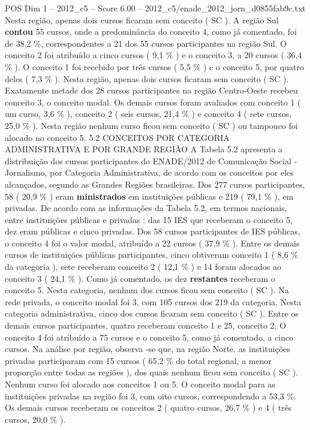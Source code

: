 \begin{textsample}{POS Dim 1 – 2012\_c5 – Score 6.00 – 2012\_c5/enade\_2012\_jorn\_d0855fab9c.txt}
Nesta região, apenas dois cursos ficaram sem conceito ( SC ).
A região Sul \textbf{contou} 55 cursos, onde a predominância do conceito 4, como já comentado, foi de 38,2 \%, correspondentes a 21 dos 55 cursos participantes na região Sul.
O conceito 2 foi atribuído a cinco cursos ( 9,1 \% ) e o conceito 3, a 20 cursos ( 36,4 \% ).
O conceito 1 foi recebido por três cursos ( 5,5 \% ) e o conceito 5, por quatro deles ( 7,3 \% ).
Nesta região, apenas dois cursos ficaram sem conceito ( SC ).
Exatamente metade dos 28 cursos participantes na região Centro-Oeste recebeu conceito 3, o conceito modal.
Os demais cursos foram avaliados com conceito 1 ( um curso, 3,6 \% ), conceito 2 ( seis cursos, 21,4 \% ) e conceito 4 ( sete cursos, 25,0 \% ).
Nesta região nenhum curso ficou sem conceito ( SC ) ou tampouco foi alocado no conceito 5. 5.2 CONCEITOS POR CATEGORIA ADMINISTRATIVA E POR GRANDE REGIÃO A Tabela 5.2 apresenta a distribuição dos cursos participantes do ENADE/2012 de Comunicação Social - Jornalismo, por Categoria Administrativa, de acordo com os conceitos por eles alcançados, segundo as Grandes Regiões brasileiras.
Dos 277 cursos participantes, 58 ( 20,9 \% ) eram \textbf{ministrados} em instituições públicas e 219 ( 79,1 \% ), em privadas.
De acordo com as informações da Tabela 5.2, em termos nacionais, entre instituições públicas e privadas : das 15 IES que receberam o conceito 5, dez eram públicas e cinco privadas.
Dos 58 cursos participantes de IES públicas, o conceito 4 foi o valor modal, atribuído a 22 cursos ( 37,9 \% ).
Entre os demais cursos de instituições públicas participantes, cinco obtiveram conceito 1 ( 8,6 \% da categoria ), sete receberam conceito 2 ( 12,1 \% ) e 14 foram alocados ao conceito 3 ( 24,1 \% ).
Como já comentado, os dez \textbf{restantes} receberam o conceito 5.
Nesta categoria, nenhum dos cursos ficou sem conceito ( SC ).
Na rede privada, o conceito modal foi 3, com 105 cursos dos 219 da categoria.
Nesta categoria administrativa, cinco dos cursos ficaram sem conceito ( SC ).
Entre os demais cursos participantes, quatro receberam conceito 1 e 25, conceito 2.
O conceito 4 foi atribuído a 75 cursos e o conceito 5, como já comentado, a cinco cursos.
Na análise por região, observa -se que, na região Norte, as instituições privadas participaram com 15 cursos ( 65,2 \% do total regional, a menor proporção entre todas as regiões ), dos quais nenhum ficou sem conceito ( SC ).
Nenhum curso foi alocado aos conceitos 1 ou 5.
O conceito modal para as instituições privadas na região foi 3, com oito cursos, correspondendo a 53,3 \%.
Os demais cursos receberam os conceitos 2 ( quatro cursos, 26,7 \% ) e 4 ( três cursos, 20,0 \% ).

\end{textsample}
